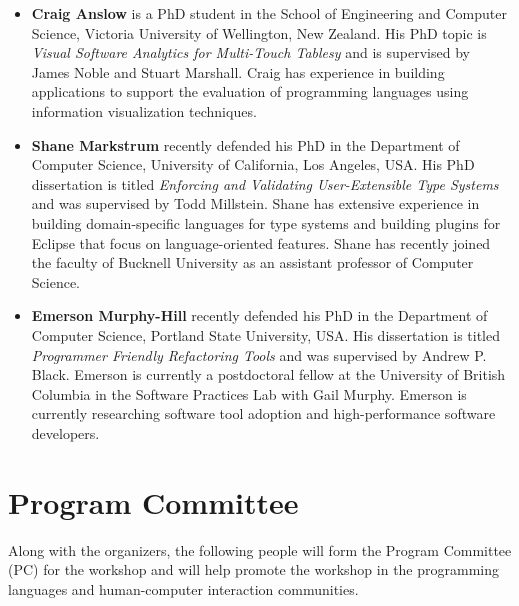 \documentclass{sigplanconf}
\begin{document}
\begin{itemize}
\item \textbf{Craig Anslow} is a PhD student in the School of
  Engineering and Computer Science, Victoria University of Wellington,
  New Zealand. His PhD topic is \emph{Visual Software Analytics for
   Multi-Touch Tablesy} and is supervised by James Noble and
  Stuart Marshall. Craig has experience in building applications to
  support the evaluation of programming languages using information
  visualization techniques.

\item \textbf{Shane Markstrum} recently defended his PhD in the
  Department of Computer Science, University of California, Los
  Angeles, USA. His PhD dissertation is titled \emph{Enforcing and
    Validating User-Extensible Type Systems} and was supervised by
  Todd Millstein. Shane has extensive experience in building
  domain-specific languages for type systems and building plugins for
  Eclipse that focus on language-oriented features. Shane has recently
  joined the faculty of Bucknell University as an assistant professor
  of Computer Science.

\item \textbf{Emerson Murphy-Hill} recently defended his PhD in the
  Department of Computer Science, Portland State University, USA. His
  dissertation is titled \emph{Programmer Friendly Refactoring Tools}
  and was supervised by Andrew P. Black. Emerson is currently a
  postdoctoral fellow at the University of British Columbia in the
  Software Practices Lab with Gail Murphy.  Emerson is currently
  researching software tool adoption and high-performance software
  developers.
\end{itemize}

\section{Program Committee}

Along with the organizers, the following people will form the Program
Committee (PC) for the workshop and will help promote the workshop in
the programming languages and human-computer interaction communities.
\end{document}
